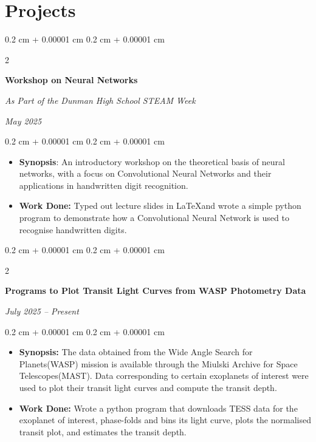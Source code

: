 \documentclass[10pt, letterpaper]{article}
\newenvironment{highlights}{
    \begin{itemize}[
        topsep=0.10 cm,
        parsep=0.10 cm,
        partopsep=0pt,
        itemsep=0pt,
        leftmargin=0.4 cm + 10pt
    ]
}{
    \end{itemize}
} %
\newenvironment{onecolentry}{
    \begin{adjustwidth}{
        0.2 cm + 0.00001 cm
    }{
        0.2 cm + 0.00001 cm
    }
}{
    \end{adjustwidth}
} %
\newenvironment{twocolentry}[2][]{
    \onecolentry
    \def\secondColumn{#2}
    \setcolumnwidth{\fill, 4.5 cm}
    \begin{paracol}{2}
}{
    \switchcolumn \raggedleft \secondColumn
    \end{paracol}
    \endonecolentry
} %
\begin{document}
 \section{Projects}



        
        \begin{twocolentry}{
            
            
        \textit{May 2025}}
            \textbf{Workshop on Neural Networks}

            \textit{As Part of the Dunman High School STEAM Week}
        \end{twocolentry}

        \vspace{0.10 cm}
        \begin{onecolentry}
            \begin{highlights}
                \item \textbf{Synopsis}: An introductory workshop on the theoretical basis of neural networks, with a focus on Convolutional Neural Networks and their applications in handwritten digit recognition.
                \item \textbf{Work Done:} Typed out lecture slides in \LaTeX and wrote a simple python program to demonstrate how a Convolutional Neural Network is used to recognise handwritten digits. 
            \end{highlights}
        \end{onecolentry}

         \begin{twocolentry}{
            
            
        \textit{July 2025 – Present}}
            \textbf{Programs to Plot Transit Light Curves from WASP Photometry Data}
            

            
        \end{twocolentry}

        \vspace{0.10 cm}
        \begin{onecolentry}
            \begin{highlights}
                \item \textbf{Synopsis:} The data obtained from the Wide Angle Search for Planets(WASP) mission is available through the Miulski Archive for Space Telescopes(MAST). Data corresponding to certain exoplanets of interest were used to plot their transit light curves and compute the transit depth.
                \item \textbf{Work Done:} Wrote a python program that downloads TESS data for the exoplanet of interest, phase-folds and bins its light curve, plots the normalised transit plot, and estimates the transit depth.
            \end{highlights}
        \end{onecolentry}
\end{document}
